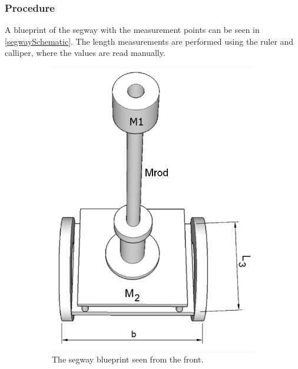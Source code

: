\subsubsection{Procedure}
A blueprint of the segway with the measurement points can be seen in \autoref{segwaySchematic}.
The length measurements are performed using the ruler and calliper, where the values are read manually.
\begin{figure}[H]
\centering
	\begin{subfigure}[b]{0.35\textwidth}

	\includegraphics[width=\textwidth]{figures/segwayModelFront.png}
	\caption{The segway blueprint seen from the front.}
	\label{fig:segwayFront}
	\end{subfigure}
	\hspace{0.2\textwidth}
	~
	\begin{subfigure}[b]{0.25\textwidth}

\end{subfigure}
\end{figure}
